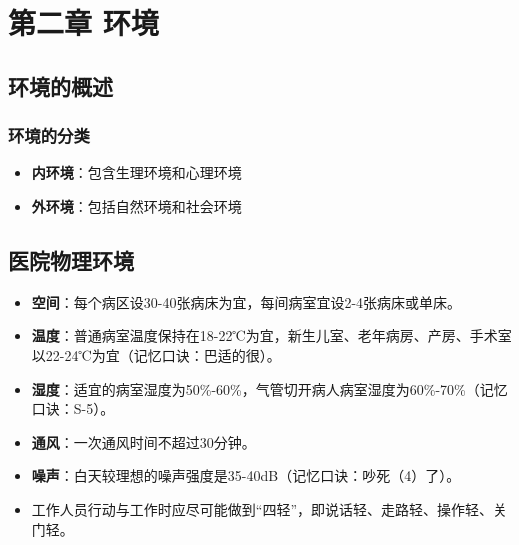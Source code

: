 \documentclass[11pt, a4paper]{ctexart}
\newcommand{\ocrimage}[1]{\texttt{#1}}
\begin{document}


\section{第二章 环境}
\subsection{环境的概述}
\subsubsection{环境的分类}
\begin{itemize}
    \item \textbf{内环境}：包含生理环境和心理环境
    \item \textbf{外环境}：包括自然环境和社会环境
\end{itemize}

\subsection{医院物理环境}
\begin{itemize}
    \item \textbf{空间}：每个病区设30-40张病床为宜，每间病室宜设2-4张病床或单床。
    \item \textbf{温度}：普通病室温度保持在18-22℃为宜，新生儿室、老年病房、产房、手术室以22-24℃为宜（记忆口诀：巴适的很）。
    \item \textbf{湿度}：适宜的病室湿度为50\%-60\%，气管切开病人病室湿度为60\%-70\%（记忆口诀：S-5）。
    \item \textbf{通风}：一次通风时间不超过30分钟。
    \item \textbf{噪声}：白天较理想的噪声强度是35-40dB（记忆口诀：吵死（4）了）。
    \item 工作人员行动与工作时应尽可能做到“四轻”，即说话轻、走路轻、操作轻、关门轻。
\end{itemize}
\end{document}

